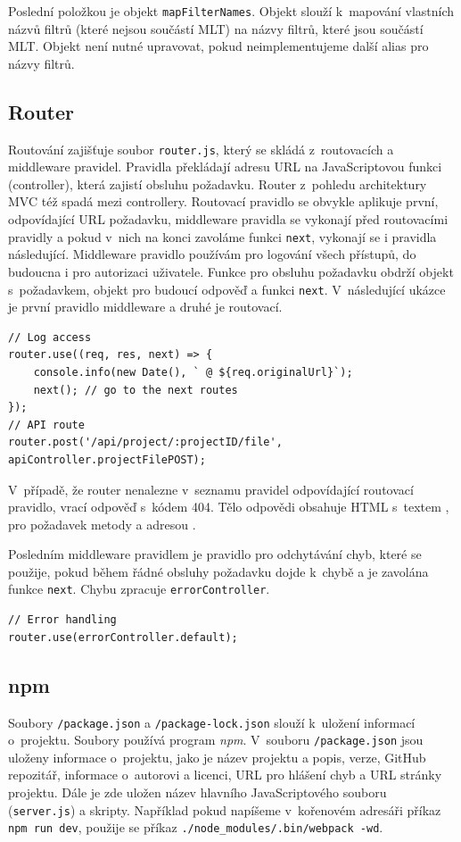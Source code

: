 Poslední položkou je objekt \texttt{mapFilterNames}. Objekt slouží k~mapování vlastních názvů filtrů (které nejsou součástí MLT) na názvy filtrů, které jsou součástí MLT. Objekt není nutné upravovat, pokud neimplementujeme další alias pro názvy filtrů.

\subsection{Router}
Routování zajišťuje soubor \texttt{router.js}, který se skládá z~routovacích a middleware pravidel. Pravidla překládají adresu URL na JavaScriptovou funkci (controller), která zajistí obsluhu požadavku. Router z~pohledu architektury MVC též spadá mezi controllery. Routovací pravidlo se obvykle aplikuje první, odpovídající URL požadavku, middleware pravidla se vykonají před routovacími pravidly a pokud v~nich na konci zavoláme funkci \texttt{next}, vykonají se i pravidla následující. Middleware pravidlo používám pro logování všech přístupů, do budoucna i pro autorizaci uživatele. Funkce pro obsluhu požadavku obdrží objekt s~požadavkem, objekt pro budoucí odpověď a funkci \texttt{next}. V~následující ukázce je první pravidlo middleware a druhé je routovací.
\begin{lstlisting}[style=JavaScript]
// Log access
router.use((req, res, next) => {
    console.info(new Date(), ` @ ${req.originalUrl}`);
    next(); // go to the next routes
});
// API route
router.post('/api/project/:projectID/file', apiController.projectFilePOST);
\end{lstlisting}

V~případě, že router nenalezne v~seznamu pravidel odpovídající routovací pravidlo, vrací odpověď s~kódem 404. Tělo odpovědi obsahuje HTML s~textem , pro požadavek metody  a adresou .

Posledním middleware pravidlem je pravidlo pro odchytávání chyb, které  se použije, pokud během řádné obsluhy požadavku dojde k~chybě a je zavolána funkce \texttt{next}. Chybu zpracuje \texttt{errorController}.
\begin{lstlisting}[style=JavaScript]
// Error handling
router.use(errorController.default);
\end{lstlisting}

\subsection{npm}
Soubory \texttt{/package.json} a \texttt{/package-lock.json} slouží k~uložení informací o~projektu. Soubory používá program \textit{npm}. V~souboru \texttt{/package.json} jsou uloženy informace o~projektu, jako je název projektu a popis, verze, GitHub repozitář, informace o~autorovi a licenci, URL pro hlášení chyb a URL stránky projektu. Dále je zde uložen název hlavního JavaScriptového souboru (\texttt{server.js}) a skripty. Například pokud napíšeme v~kořenovém adresáři příkaz \texttt{npm run dev}, použije se příkaz \texttt{./node\_modules/.bin/webpack -wd}.

